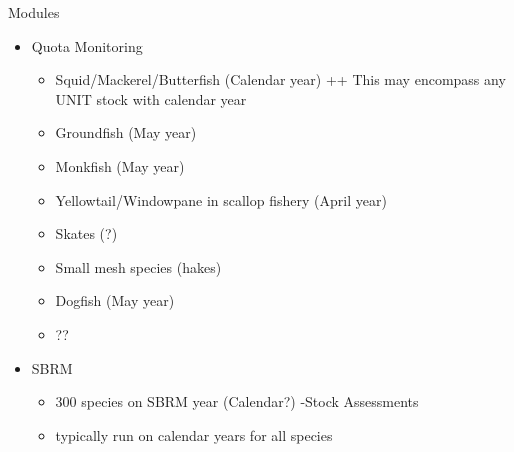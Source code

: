 \documentclass[
  ignorenonframetext,
]{beamer}
\providecommand{\tightlist}{%
  \setlength{\itemsep}{0pt}\setlength{\parskip}{0pt}}
\begin{document}
\begin{frame}{Modules}
\protect\hypertarget{modules}{}

\begin{itemize}
\tightlist
\item
  Quota Monitoring

  \begin{itemize}
  \tightlist
  \item
    Squid/Mackerel/Butterfish (Calendar year) ++ This may encompass any
    UNIT stock with calendar year
  \item
    Groundfish (May year)
  \item
    Monkfish (May year)
  \item
    Yellowtail/Windowpane in scallop fishery (April year)
  \item
    Skates (?)
  \item
    Small mesh species (hakes)
  \item
    Dogfish (May year)
  \item
    ??
  \end{itemize}
\item
  SBRM

  \begin{itemize}
  \tightlist
  \item
    300 species on SBRM year (Calendar?) -Stock Assessments
  \item
    typically run on calendar years for all species
  \end{itemize}
\end{itemize}

\end{frame}
\end{document}
